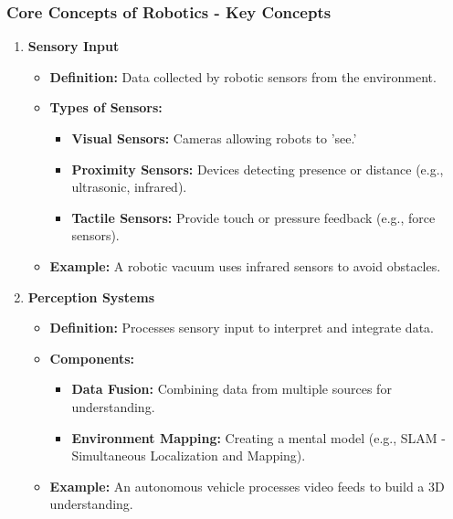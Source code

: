 \documentclass{beamer}
\begin{document}
\begin{frame}[fragile]
    \frametitle{Core Concepts of Robotics - Key Concepts}

    \begin{enumerate}
        \item \textbf{Sensory Input}
        \begin{itemize}
            \item \textbf{Definition:} Data collected by robotic sensors from the environment.
            \item \textbf{Types of Sensors:}
              \begin{itemize}
                  \item \textbf{Visual Sensors:} Cameras allowing robots to 'see.'
                  \item \textbf{Proximity Sensors:} Devices detecting presence or distance (e.g., ultrasonic, infrared).
                  \item \textbf{Tactile Sensors:} Provide touch or pressure feedback (e.g., force sensors).
              \end{itemize}
            \item \textbf{Example:} A robotic vacuum uses infrared sensors to avoid obstacles.
        \end{itemize}
        
        \item \textbf{Perception Systems}
        \begin{itemize}
            \item \textbf{Definition:} Processes sensory input to interpret and integrate data.
            \item \textbf{Components:}
              \begin{itemize}
                  \item \textbf{Data Fusion:} Combining data from multiple sources for understanding.
                  \item \textbf{Environment Mapping:} Creating a mental model (e.g., SLAM - Simultaneous Localization and Mapping).
              \end{itemize}
            \item \textbf{Example:} An autonomous vehicle processes video feeds to build a 3D understanding.
        \end{itemize}
    \end{enumerate}
\end{frame}
\end{document}
